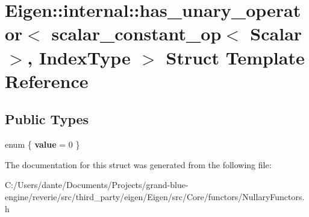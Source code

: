 \hypertarget{struct_eigen_1_1internal_1_1has__unary__operator_3_01scalar__constant__op_3_01_scalar_01_4_00_01_index_type_01_4}{}\section{Eigen\+::internal\+::has\+\_\+unary\+\_\+operator$<$ scalar\+\_\+constant\+\_\+op$<$ Scalar $>$, Index\+Type $>$ Struct Template Reference}
\label{struct_eigen_1_1internal_1_1has__unary__operator_3_01scalar__constant__op_3_01_scalar_01_4_00_01_index_type_01_4}
\subsection*{Public Types}
\begin{DoxyCompactItemize}
\item 
\mbox{\label{struct_eigen_1_1internal_1_1has__unary__operator_3_01scalar__constant__op_3_01_scalar_01_4_00_01_index_type_01_4_a727fa427a3a57d757753003000744a7d}} 
enum \{ {\bfseries value} = 0
 \}
\end{DoxyCompactItemize}


The documentation for this struct was generated from the following file\+:\begin{DoxyCompactItemize}
\item 
C\+:/\+Users/dante/\+Documents/\+Projects/grand-\/blue-\/engine/reverie/src/third\+\_\+party/eigen/\+Eigen/src/\+Core/functors/Nullary\+Functors.\+h\end{DoxyCompactItemize}
